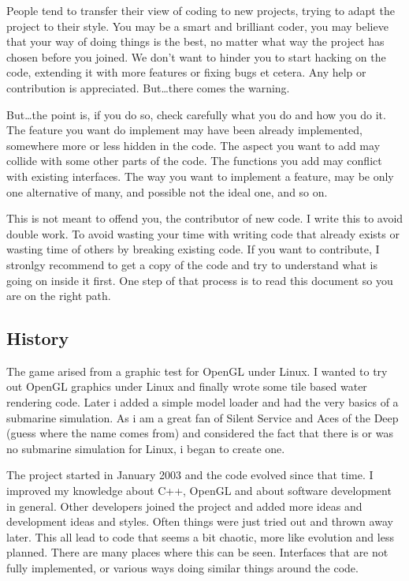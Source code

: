 \documentclass{report}
\begin{document}
People tend to transfer their view of coding to new projects, trying to
adapt the project to their style. You may be a smart and brilliant
coder, you may believe that your way of doing things is the best, no
matter what way the project has chosen before you joined. We don't want
to hinder you to start hacking on the code, extending it with more
features or fixing bugs et cetera.  Any help or contribution is
appreciated. But\ldots there comes the warning.

But\ldots the point is, if you do so, check carefully what you do and
how you do it. The feature you want do implement may have been already
implemented, somewhere more or less hidden in the code. The aspect you
want to add may collide with some other parts of the code. The functions
you add may conflict with existing interfaces. The way you want to
implement a feature, may be only one alternative of many, and possible
not the ideal one, and so on.

This is not meant to offend you, the contributor of new code. I write
this to avoid double work. To avoid wasting your time with writing code
that already exists or wasting time of others by breaking existing code.
If you want to contribute, I stronlgy recommend to get a copy of the
code and try to understand what is going on inside it first. One step of
that process is to read this document so you are on the right path.

\subsection{History}

The game arised from a graphic test for OpenGL under Linux. I wanted to
try out OpenGL graphics under Linux and finally wrote some tile based
water rendering code. Later i added a simple model loader and had the
very basics of a submarine simulation. As i am a great fan of Silent
Service and Aces of the Deep (guess where the name comes from) and
considered the fact that there is or was no submarine simulation for
Linux, i began to create one.
    
The project started in January 2003 and the code evolved since that
time. I improved my knowledge about C++, OpenGL and about software
development in general. Other developers joined the project and added
more ideas and development ideas and styles. Often things were just
tried out and thrown away later. This all lead to code that seems a bit
chaotic, more like evolution and less planned. There are many places
where this can be seen. Interfaces that are not fully implemented, or
various ways doing similar things around the code.
  
\end{document}
